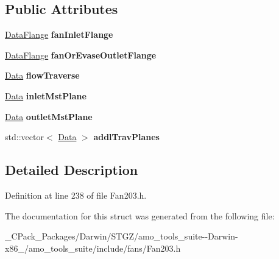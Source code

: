 \subsection*{Public Attributes}
\begin{DoxyCompactItemize}
\item 
\mbox{\label{struct_plane_data_1_1_node_binding_1_1_output_a1e03cb2e19c2b0284f75df5cdf065675}} 
\hyperlink{struct_plane_data_1_1_node_binding_1_1_data_flange}{Data\+Flange} {\bfseries fan\+Inlet\+Flange}
\item 
\mbox{\label{struct_plane_data_1_1_node_binding_1_1_output_af07f4acd58bb66b2c9c1b887427d2fbb}} 
\hyperlink{struct_plane_data_1_1_node_binding_1_1_data_flange}{Data\+Flange} {\bfseries fan\+Or\+Evase\+Outlet\+Flange}
\item 
\mbox{\label{struct_plane_data_1_1_node_binding_1_1_output_a5dfaab5fc6ebed9f699191eb3903a97e}} 
\hyperlink{struct_plane_data_1_1_node_binding_1_1_data}{Data} {\bfseries flow\+Traverse}
\item 
\mbox{\label{struct_plane_data_1_1_node_binding_1_1_output_afdb50efd9bba21241d822a10cc8b804c}} 
\hyperlink{struct_plane_data_1_1_node_binding_1_1_data}{Data} {\bfseries inlet\+Mst\+Plane}
\item 
\mbox{\label{struct_plane_data_1_1_node_binding_1_1_output_a7ca28948b57ea956833151a20f446ea1}} 
\hyperlink{struct_plane_data_1_1_node_binding_1_1_data}{Data} {\bfseries outlet\+Mst\+Plane}
\item 
\mbox{\label{struct_plane_data_1_1_node_binding_1_1_output_aee139722930a59d1be944bd1f56365a3}} 
std\+::vector$<$ \hyperlink{struct_plane_data_1_1_node_binding_1_1_data}{Data} $>$ {\bfseries addl\+Trav\+Planes}
\end{DoxyCompactItemize}


\subsection{Detailed Description}


Definition at line 238 of file Fan203.\+h.



The documentation for this struct was generated from the following file\+:\begin{DoxyCompactItemize}
\item 
\+\_\+\+C\+Pack\+\_\+\+Packages/\+Darwin/\+S\+T\+G\+Z/amo\+\_\+tools\+\_\+suite-\/-\/\+Darwin-\/x86\+\_/amo\+\_\+tools\+\_\+suite/include/fans/Fan203.\+h\end{DoxyCompactItemize}
